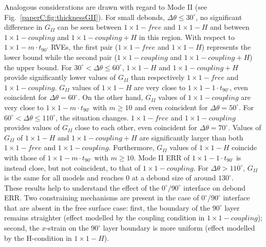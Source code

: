 Analogous considerations are drawn with regard to Mode II (see Fig.~\ref{paperC:fig:thicknessGII}). For small debonds, $\Delta\theta\leq30^{\circ}$, no significant difference in $G_{II}$ can be seen between $1\times 1-free$ and $1\times 1-H$ and between $1\times 1-coupling$ and $1\times 1-coupling+H$ in this region. With respect to $1\times 1-m\cdot t_{90^{\circ}}$ RVEs, the first pair ($1\times 1-free$ and $1\times 1-H$) represents the lower bound while the second pair ($1\times 1-coupling$ and $1\times 1-coupling+H$) the upper bound. For $30^{\circ}<\Delta\theta\leq60^{\circ}$, $1\times 1-H$ and $1\times 1-coupling+H$ provide significantly lower values of $G_{II}$ than respectively $1\times 1-free$ and $1\times 1-coupling$. $G_{II}$ values of $1\times 1-H$ are very close to $1\times 1-1\cdot t_{90^{\circ}}$, even coincident for $\Delta\theta=60^{\circ}$. On the other hand, $G_{II}$ values of $1\times 1-coupling$ are very close to $1\times 1-m\cdot t_{90^{\circ}}$ with $m\geq10$ and even coincident for $\Delta\theta=50^{\circ}$. For $60^{\circ}<\Delta\theta\leq110^{\circ}$, the situation changes. $1\times 1-free$ and $1\times 1-coupling$ provides values of $G_{II}$ close to each other, even coincident for $\Delta\theta=70^{\circ}$. Values of $G_{II}$ of $1\times 1-H$ and $1\times 1-coupling+H$ are significantly larger than both $1\times 1-free$ and $1\times 1-coupling$. Furthermore, $G_{II}$ values of $1\times 1-H$ coincide with those of $1\times 1-m\cdot t_{90^{\circ}}$ with $m\geq10$. Mode II ERR of $1\times 1-1\cdot t_{90^{\circ}}$ is instead close, but not coincident, to that of $1\times 1-coupling$. For $\Delta\theta>110^{\circ}$, $G_{II}$ is the same for all models and reaches $0$ at a debond size of around $130^{\circ}$.\\
These results help to understand the effect of the $0^{\circ}/90^{\circ}$ interface on debond ERR. Two constraining mechanisms are present in the case of $0^{\circ}/90^{\circ}$ interface that are absent in the free surface case: first, the boundary of the $90^{\circ}$ layer remains straighter (effect modelled by the coupling condition in $1\times 1-coupling$); second, the $x$-strain on the $90^{\circ}$ layer boundary is more uniform (effect modelled by the H-condition in $1\times 1-H$).\\
